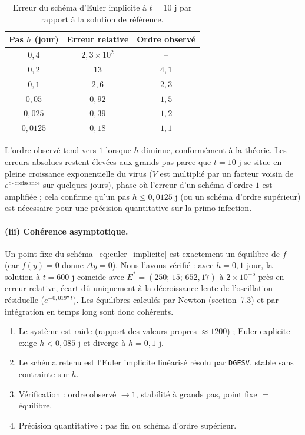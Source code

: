 \documentclass[11pt,a4paper]{report}
\theoremstyle{plain}
\theoremstyle{definition}
\theoremstyle{remark}
\begin{document}
\begin{table}[ht]
\centering
\caption{Erreur du schéma d'Euler implicite à $t=10$ j par rapport à la solution de référence.}
\label{tab:verif_ordre}
\begin{tabular}{c c c}
\toprule
\textbf{Pas $h$ (jour)} & \textbf{Erreur relative} & \textbf{Ordre observé} \\
\midrule
$0{,}4$ & $2{,}3\times10^{2}$ & -- \\
$0{,}2$ & $13$ & $4{,}1$ \\
$0{,}1$ & $2{,}6$ & $2{,}3$ \\
$0{,}05$ & $0{,}92$ & $1{,}5$ \\
$0{,}025$ & $0{,}39$ & $1{,}2$ \\
$0{,}0125$ & $0{,}18$ & $1{,}1$ \\
\bottomrule
\end{tabular}
\end{table}

L'ordre observé tend vers $1$ lorsque $h$ diminue, conformément à la théorie. Les erreurs absolues restent élevées aux grands pas parce que $t=10$ j se situe en pleine croissance exponentielle du virus ($V$ est multiplié par un facteur voisin de $e^{c\cdot\mathrm{croissance}}$ sur quelques jours), phase où l'erreur d'un schéma d'ordre $1$ est amplifiée ; cela confirme qu'un pas $h\le0{,}0125$ j (ou un schéma d'ordre supérieur) est nécessaire pour une précision quantitative sur la primo-infection.

\paragraph{(iii) Cohérence asymptotique.} Un point fixe du schéma~\eqref{eq:euler_implicite} est exactement un équilibre de $f$ (car $f(y)=0$ donne $\Delta y=0$). Nous l'avons vérifié : avec $h=0{,}1$ jour, la solution à $t=600$ j coïncide avec $E^*=(250;\,15;\,652{,}17)$ à $2\times10^{-5}$ près en erreur relative, écart dû uniquement à la décroissance lente de l'oscillation résiduelle ($e^{-0{,}0197\,t}$). Les équilibres calculés par Newton (section~7.3) et par intégration en temps long sont donc cohérents.

\begin{encadreresume}
\begin{enumerate}
    \item Le système est raide (rapport des valeurs propres $\approx1200$) ; Euler explicite exige $h<0{,}085$ j et diverge à $h=0{,}1$ j.
    \item Le schéma retenu est l'Euler implicite linéarisé résolu par \texttt{DGESV}, stable sans contrainte sur $h$.
    \item Vérification : ordre observé $\to1$, stabilité à grands pas, point fixe $=$ équilibre.
    \item Précision quantitative : pas fin ou schéma d'ordre supérieur.
\end{enumerate}
\end{encadreresume}
\end{document}
